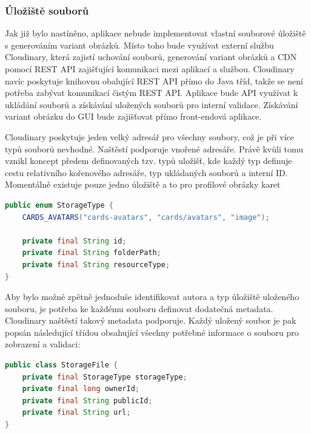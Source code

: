 		\subsubsection{Úložiště souborů}

		Jak již bylo nastíněno, aplikace nebude implementovat vlastní souborové úložiště s generováním variant obrázků.
		Místo toho bude využívat externí službu Cloudinary, která zajistí uchování souborů, generování variant obrázků
		a \ac{CDN} pomocí \ac{REST} \ac{API} zajišťující komunikaci mezi aplikací a službou.
		Cloudinary navíc poskytuje knihovnu obalující \ac{REST} \ac{API} přímo do Java tříd, takže se není potřeba zabývat
		komunikací čistým \ac{REST} \ac{API}.
		Aplikace bude \ac{API} využívat k ukládání souborů a získávání uložených souborů pro interní validace.
		Získávání variant obrázku do \ac{GUI} bude zajišťovat přímo front-endová aplikace.

		Cloudinary poskytuje jeden velký adresář pro všechny soubory, což je při více typů souborů nevhodné.
		Naštěstí podporuje vnořené adresáře.
		Právě kvůli tomu vznikl koncept předem definovaných tzv. typů uložišť, kde každý typ definuje cestu
		relativního kořenového adresáře, typ ukládaných souborů a interní ID.
		Momentálně existuje pouze jedno úložiště a to pro profilové obrázky karet

		\begin{lstlisting}[language=Java, caption={Ukázka definových typů uložišť. Zdroj: [autor]}]
public enum StorageType {
    CARDS_AVATARS("cards-avatars", "cards/avatars", "image");

    private final String id;
    private final String folderPath;
    private final String resourceType;
}
		\end{lstlisting}

		Aby bylo možné zpětně jednoduše identifikovat autora a typ úložiště uloženého souboru, je potřeba ke každému
		souboru definovat dodatečná metadata.
		Cloudinary naštěstí takový metadata podporuje.
		Každý uložený soubor je pak popsán následující třídou obsahující všechny potřebné informace o souboru pro zobrazení
		a validaci:

		\begin{lstlisting}[language=Java, caption={Třída popisující uložený soubor v Cloudinary uložišti. Zdroj: [autor]}]
public class StorageFile {
    private final StorageType storageType;
    private final long ownerId;
    private final String publicId;
    private final String url;
}
		\end{lstlisting}

